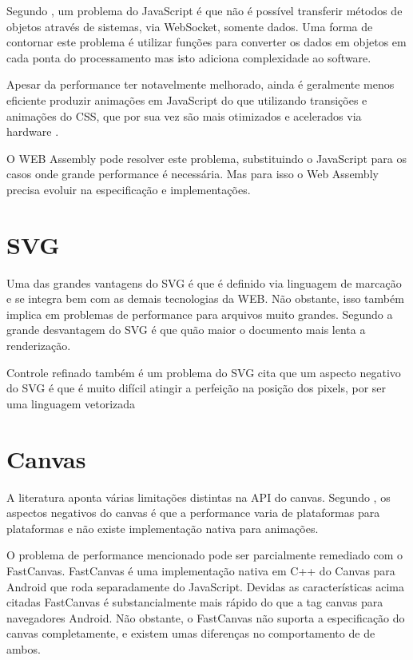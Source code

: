 Segundo \cite{htmlResearchJournal}, um problema do JavaScript é que
não é possível transferir métodos de objetos através de sistemas,
via WebSocket, somente dados. Uma forma de contornar este problema é
utilizar funções para converter os dados em objetos em cada ponta do
processamento mas isto adiciona complexidade ao software.

Apesar da performance ter notavelmente melhorado, ainda é geralmente
menos eficiente produzir animações em JavaScript do que utilizando
transições e animações do CSS, que por sua vez são mais otimizados
e acelerados via hardware \autocite{html5mostwanted}.

O WEB Assembly pode resolver este problema, substituindo o JavaScript
para os casos onde grande performance é necessária. Mas para isso o
Web Assembly precisa evoluir na especificação e implementações.


\section{SVG}

Uma das grandes vantagens do SVG é que é definido via linguagem de marcação e se integra bem com as demais tecnologias da WEB. Não obstante, isso também implica em problemas de performance para arquivos muito grandes.
Segundo \cite{html5mostwanted} a grande desvantagem do SVG é que quão
maior o documento mais lenta a renderização.

Controle refinado também é um problema do SVG \cite{html5mostwanted} cita que
um aspecto negativo do SVG é que é muito difícil atingir a
perfeição na posição dos pixels, por ser uma linguagem vetorizada

\section{Canvas}

A literatura aponta várias limitações distintas na API do canvas.
Segundo \autocite{html5mostwanted}, os aspectos negativos do canvas é
que a performance varia de plataformas para plataformas e não existe
implementação nativa para animações.

O problema de performance mencionado pode ser parcialmente remediado
com o FastCanvas. FastCanvas é uma implementação nativa em C++ do
Canvas para Android que roda separadamente do JavaScript. Devidas as
características acima citadas FastCanvas é substancialmente mais
rápido do que a tag canvas para navegadores Android. Não obstante, o
FastCanvas não suporta a especificação do canvas completamente, e
existem umas diferenças no comportamento de de ambos.


